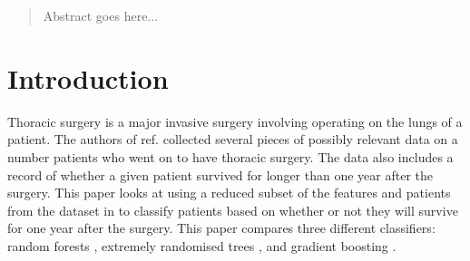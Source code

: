 \documentclass[journal]{IEEEtran}
\begin{document}




\maketitle









%
\IEEEpeerreviewmaketitle

\begin{abstract}
	Abstract goes here...
\end{abstract}

\section{Introduction}
Thoracic surgery is a major invasive surgery involving operating on the lungs of a patient. The authors of ref. \cite{zikeba2014boosted} collected several pieces of possibly relevant data on a number patients who went on to have thoracic surgery. The data also includes a record of whether a given patient survived for longer than one year after the surgery. This paper looks at using a reduced subset of the features and patients from the dataset in \cite{zikeba2014boosted} to classify patients based on whether or not they will survive for one year after the surgery. This paper compares three different classifiers: random forests \cite{breiman2001random}, extremely randomised trees \cite{geurts2006extremely}, and gradient boosting \cite{natekin2013gradient}. 
\end{document}
